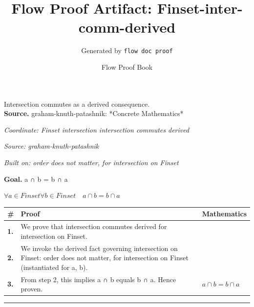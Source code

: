\documentclass[11pt]{article}
\title{Flow Proof Artifact: Finset-inter-comm-derived}
\author{Generated by \texttt{flow doc proof}}
\date{Flow Proof Book}
\theoremstyle{definition}
\begin{document}
\maketitle
Intersection commutes as a derived consequence.\\[0.5em]
\textbf{Source.} graham-knuth-patashnik: *Concrete Mathematics*\\[0.5em]
\bigskip
{}\par
\smallskip\noindent\textit{Coordinate: Finset \cdot intersection \cdot intersection commutes derived}\par
\smallskip\noindent\textit{Source: graham-knuth-patashnik}\par
\smallskip\noindent\textit{Built on: order does not matter, for intersection on Finset}\par
\medskip
\noindent\textbf{Goal.} a ∩ b = b ∩ a\par
\noindent$\displaystyle \forall a \in Finset \forall b \in Finset\quad a ∩ b = b ∩ a$\par
\medskip
\noindent
\begin{tabular}{@{} >{\raggedright\arraybackslash}p{} >{\raggedright\arraybackslash}p{} >{\raggedleft\arraybackslash}p{} @{}}
\textbf{\#} & \textbf{Proof} & \textbf{Mathematics} \\
\midrule
\textbf{1.} & We prove that intersection commutes derived for intersection on Finset. & \\[0.45em]
\textbf{2.} & We invoke the derived fact governing intersection on Finset: order does not matter, for intersection on Finset (instantiated for a, b). & \\[0.45em]
\textbf{3.} & From step 2, this implies a ∩ b equals b ∩ a. Hence proven. & $\displaystyle a ∩ b = b ∩ a$ \\[0.45em]
\bottomrule
\end{tabular}
\label{thm:Finset-intersection-intersection_commutes_derived}
\par\medskip\hrule
\end{document}
